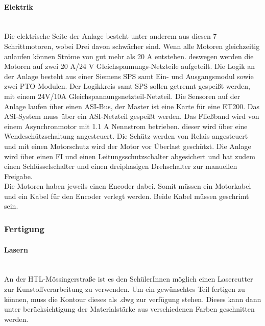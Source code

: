 \paragraph{Elektrik}\mbox{}\\
Die elektrische Seite der Anlage besteht unter anderem aus diesen 7 Schrittmotoren, wobei Drei davon schwächer sind. Wenn alle Motoren gleichzeitig anlaufen können Ströme von gut mehr als 20 A entstehen. deswegen werden die Motoren auf zwei 20 A/24 V Gleichspannungs-Netzteile aufgeteilt. Die Logik an der Anlage besteht aus einer Siemens SPS samt Ein- und Ausgangsmodul sowie zwei PTO-Modulen. Der Logikkreis samt SPS sollen getrennt gespeißt werden, mit einem 24V/10A Gleichspannungsnetzteil-Netzteil. Die Sensoren auf der Anlage laufen über einen ASI-Bus, der Master ist eine Karte für eine ET200. Das ASI-System muss über ein ASI-Netzteil gespeißt werden. Das Fließband wird von einem Asynchronmotor mit 1.1 A Nennstrom betrieben. dieser wird über eine Wendeschützschaltung angesteuert. Die Schütz werden von Relais angesteuert und mit einen Motorschutz wird der Motor vor Überlast geschützt. Die Anlage wird über einen FI und einen Leitungsschutzschalter abgesichert und hat zudem einen Schlüsselschalter und einen dreiphasigen Drehschalter zur manuellen Freigabe.\\
Die Motoren haben jeweils einen Encoder dabei. Somit müssen ein Motorkabel und ein Kabel für den Encoder verlegt werden. Beide Kabel müssen geschrimt sein. 



\subsubsection{Fertigung}

\paragraph{Lasern}\mbox{}\\
An der HTL-Mössingerstraße ist es den SchülerInnen möglich einen Lasercutter zur Kunstoffverarbeitung zu verwenden. Um ein gewünschtes Teil fertigen zu können, muss die Kontour dieses als .dwg zur verfügung stehen. Dieses kann dann unter berücksichtigung der Materialstärke aus verschiedenen Farben geschnitten werden.



